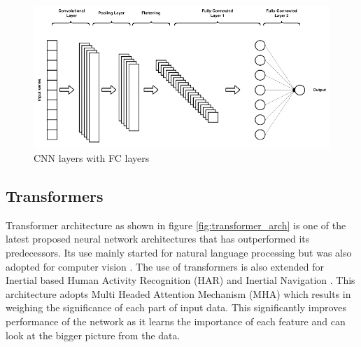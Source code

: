 \begin{figure}[H]
    \centering
    \includegraphics[scale=0.4]{images/fig_chapter2/nns/cnn_mlp.png}
    \caption{CNN layers with FC layers}
    \label{fig:cnn_fc}
\end{figure}

\subsection{Transformers}
Transformer architecture as shown in figure \ref{fig:transformer_arch} is one of the latest proposed neural network architectures that has outperformed its predecessors. Its use mainly started for natural language processing \citep{vaswani2017attention} but was also adopted for computer vision \citep{dosovitskiy2020image}. The use of transformers is also extended for Inertial based Human Activity Recognition (HAR) \cite{shavit2021boosting} and Inertial Navigation \citep{rao2022ctin}. This architecture adopts Multi Headed Attention Mechanism (MHA) \citep{vaswani2017attention} which results in weighing the significance of each part of input data. This significantly improves performance of the network as it learns the importance of each feature and can look at the bigger picture from the data.

